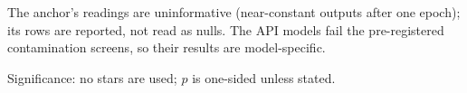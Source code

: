 \begin{table}[htbp]
\begin{threeparttable}
\begin{tablenotes}[flushleft]
\item The anchor's readings are uninformative (near-constant outputs after one epoch); its rows are reported, not read as nulls. The API models fail the pre-registered contamination screens, so their results are model-specific.
\item Significance: no stars are used; $p$ is one-sided unless stated.
\end{tablenotes}
\end{threeparttable}
\end{table}
